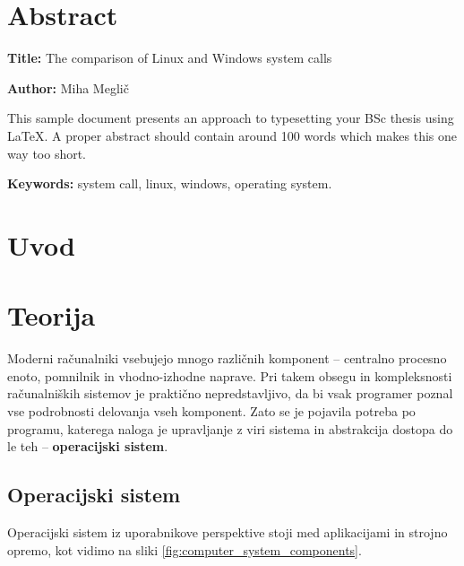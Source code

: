 \documentclass[a4paper,12pt,openright]{book}
\newcommand{\ttitleEn}{The comparison of Linux and Windows system calls}
\newcommand{\tauthor}{Miha Meglič}
\newcommand{\tkeywordsEn}{system call, linux, windows, operating system}
\newcommand{\clearemptydoublepage}{\newpage{\pagestyle{empty}\cleardoublepage}}
\begin{document}
\chapter*{Abstract}

\noindent\textbf{Title:} \ttitleEn
\bigskip

\noindent\textbf{Author:} \tauthor
\bigskip

\noindent This sample document presents an approach to typesetting your BSc thesis using \LaTeX. 
A proper abstract should contain around 100 words which makes this one way too short.
\bigskip

\noindent\textbf{Keywords:} \tkeywordsEn.
\clearemptydoublepage

\mainmatter
\setcounter{page}{1}
\pagestyle{fancy}

\chapter{Uvod}


\chapter{Teorija}

Moderni računalniki vsebujejo mnogo različnih komponent -- centralno procesno enoto, pomnilnik in vhodno-izhodne naprave.
Pri takem obsegu in kompleksnosti računalniških sistemov je praktično nepredstavljivo, da bi vsak programer poznal vse podrobnosti delovanja vseh komponent.
Zato se je pojavila potreba po programu, katerega naloga je upravljanje z viri sistema in abstrakcija dostopa do le teh -- \textbf{operacijski sistem}.
\cite{Tanenbaum_Bos_2023}

\section{Operacijski sistem}

Operacijski sistem iz uporabnikove perspektive stoji med aplikacijami in strojno opremo, kot vidimo na sliki \ref{fig:computer_system_components}.
\cite{Silberschatz_Galvin_Gagne_2018}
\end{document}
